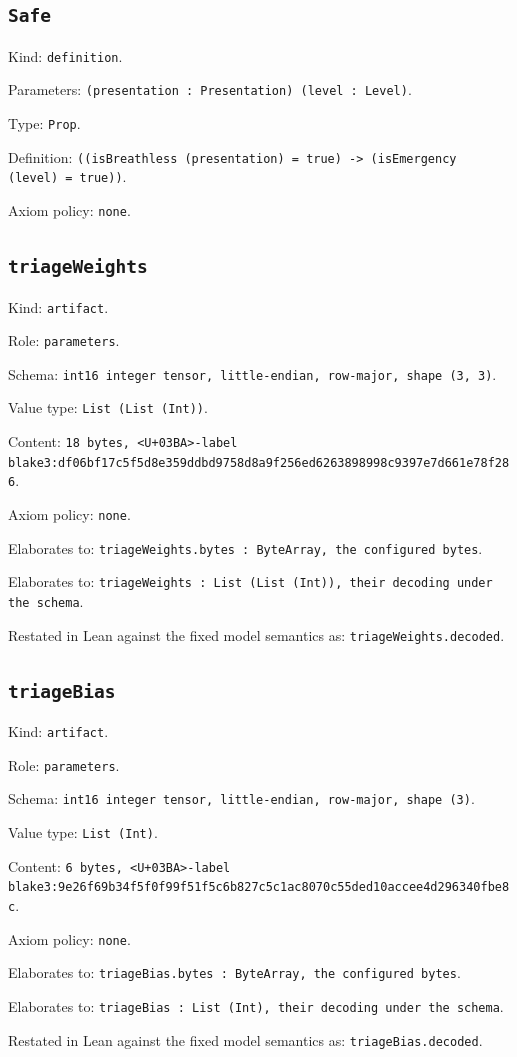 \documentclass[11pt]{article}
\begin{document}
\subsection*{\texttt{Safe}}
\noindent Kind: \texttt{definition}.\par
\noindent Parameters: \texttt{(presentation : Presentation) (level : Level)}.\par
\noindent Type: \texttt{Prop}.\par
\noindent Definition: \texttt{((isBreathless (presentation) = true) -> (isEmergency (level) = true))}.\par
\noindent Axiom policy: \texttt{none}.\par
\subsection*{\texttt{triageWeights}}
\noindent Kind: \texttt{artifact}.\par
\noindent Role: \texttt{parameters}.\par
\noindent Schema: \texttt{int16 integer tensor, little-endian, row-major, shape (3, 3)}.\par
\noindent Value type: \texttt{List (List (Int))}.\par
\noindent Content: \texttt{18 bytes, <U+03BA>-label blake3:df06bf17c5f5d8e359ddbd9758d8a9f256ed6263898998c9397e7d661e78f286}.\par
\noindent Axiom policy: \texttt{none}.\par
\noindent Elaborates to: \texttt{triageWeights.bytes : ByteArray, the configured bytes}.\par
\noindent Elaborates to: \texttt{triageWeights : List (List (Int)), their decoding under the schema}.\par
\noindent Restated in Lean against the fixed model semantics as: \texttt{triageWeights.decoded}.\par
\subsection*{\texttt{triageBias}}
\noindent Kind: \texttt{artifact}.\par
\noindent Role: \texttt{parameters}.\par
\noindent Schema: \texttt{int16 integer tensor, little-endian, row-major, shape (3)}.\par
\noindent Value type: \texttt{List (Int)}.\par
\noindent Content: \texttt{6 bytes, <U+03BA>-label blake3:9e26f69b34f5f0f99f51f5c6b827c5c1ac8070c55ded10accee4d296340fbe8c}.\par
\noindent Axiom policy: \texttt{none}.\par
\noindent Elaborates to: \texttt{triageBias.bytes : ByteArray, the configured bytes}.\par
\noindent Elaborates to: \texttt{triageBias : List (Int), their decoding under the schema}.\par
\noindent Restated in Lean against the fixed model semantics as: \texttt{triageBias.decoded}.\par
\end{document}
